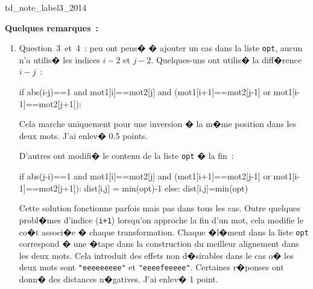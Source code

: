 \begin{xdemoexonot}{td_note_label3_2014}



\textbf{Quelques remarques~:}

\begin{enumerate}

\item Question~3~et~4~:  peu ont pens� � ajouter un cas dans la liste \texttt{opt}, aucun n'a utilis� les indices $i-2$ et $j-2$. Quelques-uns ont utilis� la diff�rence $i-j$~:

\begin{verbatimx}
			if abs(i-j)==1 and mot1[i]==mot2[j] and (mot1[i+1]==mot2[j-1] or mot1[i-1]==mot2[j+1]):
\end{verbatimx}

Cela marche uniquement pour une inversion � la m�me position dans les deux mots. J'ai enlev� 0.5 points.

D'autres ont modifi� le contenu de la liste \texttt{opt} � la fin~:

\begin{verbatimx}
			if abs(j-i)==1 and mot1[i]==mot2[j] and (mot1[i+1]==mot2[j-1] or mot1[i-1]==mot2[j+1]):
				dist[i,j] = min(opt)-1
			else:
				dist[i,j]=min(opt)
\end{verbatimx}

Cette solution fonctionne parfois mais pas dans tous les cas. Outre quelques probl�mes d'indice (\texttt{i+1}) lorsqu'on approche la fin d'un mot, cela modifie le co�t associ�e � chaque transformation. Chaque �l�ment dans la liste \texttt{opt} correspond � une �tape dans la construction du meilleur alignement dans les deux mots. Cela introduit des effets non d�sirables dans le cas o� les deux mots sont \texttt{"eeeeeeeee"} et \texttt{"eeeefeeeee"}. Certaines r�ponses ont donn� des distances n�gatives.
J'ai enlev� 1 point.

\end{enumerate}


\end{xdemoexonot}
\fi



\newpage


